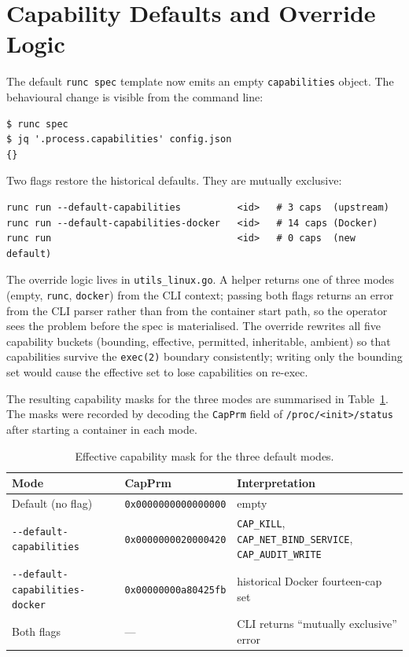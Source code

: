 \section{Capability Defaults and Override Logic}\label{sec:impl-caps}

The default \texttt{runc spec} template now emits an empty \texttt{capabilities} object. The behavioural change is visible from the command line:

\begin{verbatim}
$ runc spec
$ jq '.process.capabilities' config.json
{}
\end{verbatim}

Two flags restore the historical defaults. They are mutually exclusive:

\begin{verbatim}
runc run --default-capabilities          <id>   # 3 caps  (upstream)
runc run --default-capabilities-docker   <id>   # 14 caps (Docker)
runc run                                 <id>   # 0 caps  (new default)
\end{verbatim}

The override logic lives in \texttt{utils\_linux.go}. A helper returns one of three modes (empty, \texttt{runc}, \texttt{docker}) from the CLI context; passing both flags returns an error from the CLI parser rather than from the container start path, so the operator sees the problem before the spec is materialised. The override rewrites all five capability buckets (bounding, effective, permitted, inheritable, ambient) so that capabilities survive the \texttt{exec(2)} boundary consistently; writing only the bounding set would cause the effective set to lose capabilities on re-exec.

The resulting capability masks for the three modes are summarised in Table~\ref{tab:capmodes}. The masks were recorded by decoding the \texttt{CapPrm} field of \texttt{/proc/<init>/status} after starting a container in each mode.

\begin{table}[ht]
\centering
\caption{Effective capability mask for the three default modes.}
\label{tab:capmodes}
\begin{tabular}{p{4.8cm}p{3.6cm}p{5.2cm}}
\toprule
\textbf{Mode} & \textbf{CapPrm} & \textbf{Interpretation} \\
\midrule
Default (no flag) & \texttt{0x0000000000000000} & empty \\
\texttt{-{}-default-capabilities} & \texttt{0x0000000020000420} & \texttt{CAP\_KILL}, \texttt{CAP\_NET\_BIND\_SERVICE}, \texttt{CAP\_AUDIT\_WRITE} \\
\texttt{-{}-default-capabilities-docker} & \texttt{0x00000000a80425fb} & historical Docker fourteen-cap set \\
Both flags & --- & CLI returns ``mutually exclusive'' error \\
\bottomrule
\end{tabular}
\end{table}


